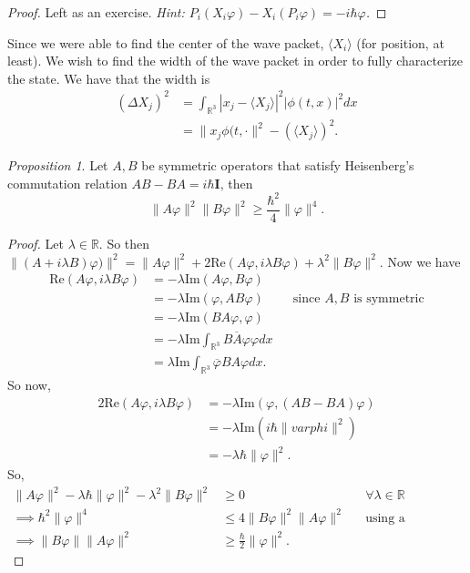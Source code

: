 \documentclass[leqno]{article}
\theoremstyle{definition}
\theoremstyle{remark}
\theoremstyle{theorem}
\newtheorem{proposition}{Proposition}
\newcommand{\R}{\mathbb{R}}
\newcommand{\im}{\mathrm{Im}}
\newcommand{\re}{\mathrm{Re}}
\begin{document}
\begin{proof}
Left as an exercise. \emph{Hint: $P_i(X_i \varphi)-X_i(P_i\varphi)=-i\hbar \varphi$.}
\end{proof}

Since we were able to find the center of the wave packet, $\langle X_i \rangle$ (for position, at least).  We wish to find the width of the wave packet in order to fully characterize the state.  We have that the width is
\begin{align*}
(\Delta X_j)^2 &= \int_{\R^3} |x_j - \langle X_j \rangle |^2 |\phi(t,x)|^2 dx\\
&= \|x_j \phi(t,\cdot \|^2 - (\langle X_j \rangle)^2.
\end{align*}

\begin{proposition}
Let $A, B$ be symmetric operators that satisfy Heisenberg's commutation relation $AB-BA=i\hbar \mathbf{I}$, then
\[
\|A\varphi\|^2 \|B\varphi\|^2 \geq \frac{\hbar^2}{4} \|\varphi\|^4.
\]
\end{proposition}

\begin{proof}
Let $\lambda \in \R$. So then $\|(A+i\lambda B)\varphi)\|^2=\|A\varphi\|^2 +2\mathrm{Re}(A\varphi,i\lambda B \varphi)+\lambda^2 \|B\varphi\|^2$. Now we have
\begin{align*}
\mathrm{Re}(A\varphi,i\lambda B\varphi) &= -\lambda \im (A\varphi,B\varphi)\\
&= -\lambda \im (\varphi, AB\varphi) && \textrm{since $A,B$ is symmetric}\\
&= -\lambda \im (BA\varphi,\varphi)\\
&= -\lambda \im \int_{\R^3} \overline{BA\varphi}\varphi dx \\
&= \lambda \im \int_{\R^3} \overline{\varphi}BA\varphi dx.
\end{align*}
So now, 
\begin{align*}
2\re (A\varphi,i\lambda B \varphi)&= -\lambda \im (\varphi,(AB-BA)\varphi)\\
&= -\lambda \im (i\hbar \|varphi\|^2)\\
&= -\lambda \hbar \|\varphi\|^2.
\end{align*}
So,
\begin{align*}
\|A\varphi\|^2-\lambda \hbar \|\varphi\|^2 - \lambda^2 \|B\varphi\|^2 &\geq 0 && \forall \lambda \in \R\\
\implies \hbar^2 \|\varphi\|^4 &\leq 4 \|B\varphi\|^2\|A\varphi\|^2 && \textrm{using a discrimant or something}\\
\implies \|B\varphi\|\|A\varphi\|^2 &\geq \frac{\hbar}{2}\|\varphi\|^2.
\end{align*}
\end{proof}
\end{document}
